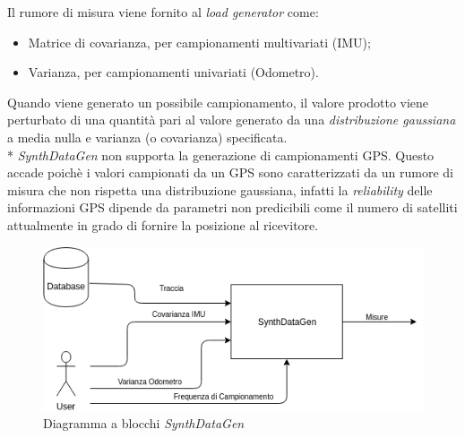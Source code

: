 Il rumore di misura viene fornito al \emph{load generator} come:
\begin{itemize}
	\item Matrice di covarianza, per campionamenti multivariati (IMU);
	\item Varianza, per campionamenti univariati (Odometro).
\end{itemize}
Quando viene generato un possibile campionamento, il valore prodotto viene perturbato di una quantit\`a pari al valore generato da una \emph{distribuzione gaussiana} a media nulla e varianza (o covarianza) specificata.\\*
\emph{SynthDataGen} non supporta la generazione di campionamenti GPS. Questo accade poich\`e i valori campionati da un GPS sono caratterizzati da un rumore di misura che non rispetta una distribuzione gaussiana, infatti la \emph{reliability} delle informazioni GPS dipende da parametri non predicibili come il numero di satelliti attualmente in grado di fornire la posizione al ricevitore.  \cite{gpsdarkarea}
\begin{figure}[h]
	\centering
	\includegraphics[width=0.7\linewidth]{img/SynthDataGen}
	\caption{Diagramma a blocchi \emph{SynthDataGen}}
	\label{fig:synthdatagen}
\end{figure}
